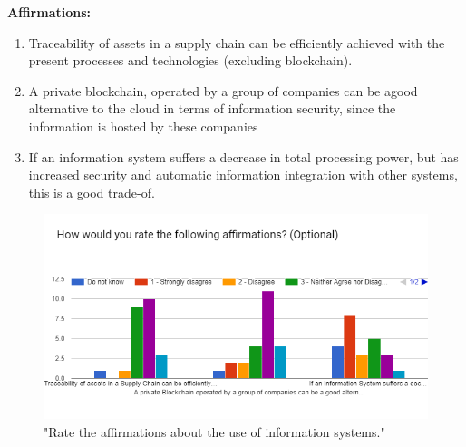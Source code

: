 \textbf{Affirmations: }
\begin{enumerate}
\item Traceability of assets in a supply
chain can be efficiently achieved
with the present processes and
technologies (excluding blockchain).
\item A private blockchain, operated by a group
of companies can be agood alternative to 
the cloud in terms of information security,
since the information is hosted by these
companies
\item If an information system suffers a 
decrease in total processing power, but
has increased security and automatic
information integration with other
systems, this is a good trade-of.
\end{enumerate}


\begin{figure}[h]
\centering
\includegraphics[scale=0.60]{media/affirmations_SC_info_systems.png}
\caption["Rate the affirmations about the use of information systems."]{"Rate the affirmations about the use of information systems."}
\label{fig:affirmations_SC_info_systems}
\end{figure}


